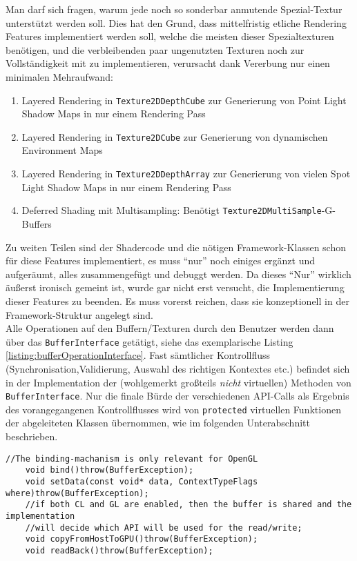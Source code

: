 	Man darf sich fragen, warum jede noch so sonderbar anmutende Spezial-Textur unterstützt werden soll. Dies
	hat den Grund, dass mittelfristig etliche Rendering Features implementiert werden soll, welche die meisten dieser 	
	Spezialtexturen benötigen, und die verbleibenden paar ungenutzten Texturen noch zur Vollständigkeit mit zu 
	implementieren, verursacht dank Vererbung nur einen minimalen Mehraufwand:
	\begin{enumerate}
		\item Layered Rendering in \lstinline|Texture2DDepthCube| zur Generierung von Point Light Shadow Maps
		in nur einem Rendering Pass
		\item Layered Rendering in \lstinline|Texture2DCube| zur Generierung von dynamischen Environment Maps
		\item  Layered Rendering in \lstinline|Texture2DDepthArray| zur Generierung von vielen Spot Light Shadow Maps
		in nur einem Rendering Pass
		\item Deferred Shading mit Multisampling: Benötigt \lstinline|Texture2DMultiSample|-G-Buffers
	\end{enumerate}
	Zu weiten Teilen sind der Shadercode und die nötigen Framework-Klassen schon für diese Features implementiert,
	es muss "`nur"' noch einiges ergänzt und aufgeräumt, alles zusammengefügt und debuggt werden. 
	Da dieses "`Nur"' wirklich äußerst ironisch gemeint ist, wurde gar nicht erst versucht, 
	die Implementierung dieser Features zu beenden. Es muss vorerst reichen,
	dass sie konzeptionell in der Framework-Struktur angelegt sind.\\
	
	
	
	Alle Operationen auf den Buffern/Texturen durch den Benutzer werden dann über das \lstinline|BufferInterface|
	getätigt, siehe das exemplarische Listing \ref{listing:bufferOperationInterface}. 
	Fast sämtlicher Kontrollfluss (Synchronisation,Validierung, Auswahl des richtigen Kontextes etc.)
	befindet sich in der Implementation	der (wohlgemerkt großteils \emph{nicht} virtuellen) 
	Methoden von \lstinline|BufferInterface|. 
	Nur die finale Bürde der verschiedenen API-Calls als Ergebnis des vorangegangenen Kontrollflusses
	wird von \lstinline|protected| virtuellen Funktionen der abgeleiteten Klassen übernommen, wie im folgenden 	
	Unterabschnitt beschrieben.
	
\begin{lstlisting}[caption={Operationen auf dem BufferInterface, Ausschnitt},label=listing:bufferOperationInterface]		
	//The binding-machanism is only relevant for OpenGL	
	void bind()throw(BufferException);
	void setData(const void* data, ContextTypeFlags where)throw(BufferException);
	//if both CL and GL are enabled, then the buffer is shared and the implementation
	//will decide which API will be used for the read/write;
	void copyFromHostToGPU()throw(BufferException);
	void readBack()throw(BufferException);
\end{lstlisting}
	
